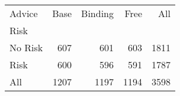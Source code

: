 \begin{tabular}{lrrrr}
Advice & Base & Binding & Free & All \\
Risk &  &  &  &  \\
No Risk & 607 & 601 & 603 & 1811 \\
Risk & 600 & 596 & 591 & 1787 \\
All & 1207 & 1197 & 1194 & 3598 \\
\end{tabular}
